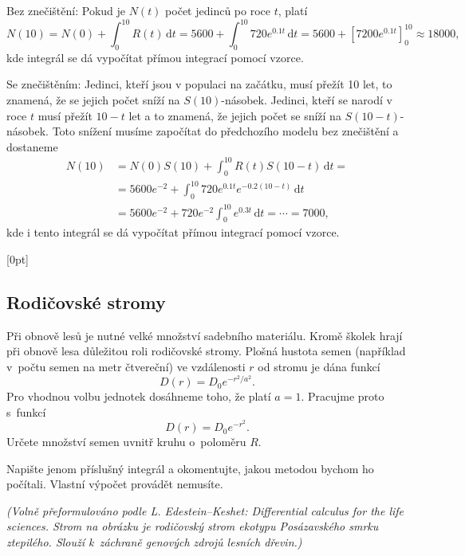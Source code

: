 Bez znečištění:
Pokud je $N(t)$ počet jedinců po roce $t$, platí
$$N(10)=N(0)+\int_0^{10} R(t)\,\mathrm dt=5600+\int_0^{10} 720 e^{0.1 t}\,\mathrm dt=
5600+\left[7200 e^{0.1t}\right]_0^{10}\approx 18000,
$$
kde integrál se dá vypočítat přímou integrací pomocí vzorce.

Se znečištěním: Jedinci, kteří jsou v populaci na začátku, musí přežít 10 let, to znamená, že se jejich počet sníží na $S(10)$-násobek. Jedinci, kteří se narodí v roce $t$ musí přežít $10-t$ let a to znamená, že jejich počet se sníží na $S(10-t)$-násobek. Toto snížení musíme započítat do předchozího modelu bez znečištění a dostaneme
$$
\begin{aligned}
N(10)&=N(0)S(10)+\int_0^{10} R(t)S(10-t)\,\mathrm dt=\\&=5600 e^{-2}+\int_0^{10} 720 e^{0.1 t}e^{-0.2(10-t)}\,\mathrm dt\\&=
5600 e^{-2}+720 e^{-2} \int_0^{10}  e^{0.3 t}\,\mathrm dt=
\cdots =7000,
\end{aligned}
$$
kde i tento integrál se dá vypočítat přímou integrací pomocí vzorce.

\konec

\stranka

[0pt]


\subsection{Rodičovské stromy} Při obnově lesů je nutné velké množství
sadebního materiálu. Kromě školek hrají při obnově lesa důležitou roli
rodičovské stromy. Plošná hustota semen (například v počtu semen na
metr čtvereční) ve vzdálenosti $r$ od stromu je dána
funkcí $$D(r)=D_0 e^{-r^2/a^2}.$$ Pro vhodnou volbu jednotek dosáhneme
toho, že platí $a=1$. Pracujme proto s funkcí
$$D(r)=D_0 e^{-r^2}.$$ Určete množství semen uvnitř kruhu o poloměru $R$.

Napište jenom příslušný integrál a okomentujte, jakou metodou bychom
ho počítali. Vlastní výpočet provádět nemusíte.

\textit{(Volně přeformulováno podle L. Edestein--Keshet: Differential calculus
for the life sciences. Strom na obrázku je rodičovský strom ekotypu
Posázavského smrku ztepilého. Slouží k záchraně genových zdrojů
lesních dřevin.)}

